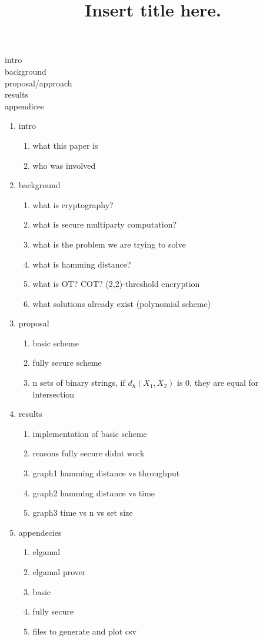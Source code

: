 \documentclass[12pt]{article}
\begin{document}
\title{Insert title here.}


intro
\\background
\\proposal/approach
\\results
\\appendices

\begin{enumerate}
\item intro
	\begin{enumerate}
	\item what this paper is
	\item who was involved
	\end{enumerate}
\item background
	\begin{enumerate}
	\item what is cryptography?
	\item what is secure multiparty computation?
	\item what is the problem we are trying to solve
	\item what is hamming distance?
	\item what is OT? COT? (2,2)-threshold encryption	
	\item what solutions already exist (polynomial scheme) 
	\end{enumerate}
\item proposal
	\begin{enumerate}
	\item basic scheme
	\item fully secure scheme
	\item n sets of binary strings, if $d_h(X_1,X_2)$ is 0, they are equal for intersection
	\end{enumerate}
\item results
	\begin{enumerate}
	\item implementation of basic scheme
	\item reasons fully secure didnt work
	\item graph1 hamming distance vs throughput
	\item graph2 hamming distance vs time
	\item graph3 time vs n vs set size
	\end{enumerate}
\item appendecies
	\begin{enumerate}
	\item elgamal
	\item elgamal prover
	\item basic
	\item fully secure
	\item files to generate and plot csv
	\end{enumerate}
\end{enumerate}
\end{document}
